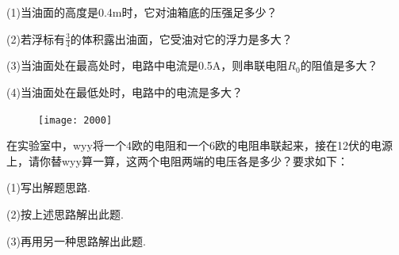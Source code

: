 \documentclass[11pt,a4paper]{article}
\newcommand{\nianfen}[1]{\hspace{-2em}{(#1\textbf{·}\textit{青岛})}}
\begin{document}
	(1)当油面的高度是0.4m时，它对油箱底的压强足多少？
	
	(2)若浮标有$\frac{3}{4}$的体积露出油面，它受油对它的浮力是多大？
	
	(3)当油面处在最高处时，电路中电流是0.5A，则串联电阻$ R_0 $的阻值是多大？
	
	(4)当油面处在最低处时，电路中的电流是多大？
	
	\rule{0em}{15em}
	
	\begin{figure}
		\texttt{[image: 2000]}
	\end{figure}
	\nianfen{2000}在实验室中，wyy将一个4欧的电阻和一个6欧的电阻串联起来，接在12伏的电源上，请你替wyy算一算，这两个电阻两端的电压各是多少？要求如下：
	
	(1)写出解题思路.
	
	(2)按上述思路解出此题.
	
	(3)再用另一种思路解出此题.
\end{document}
